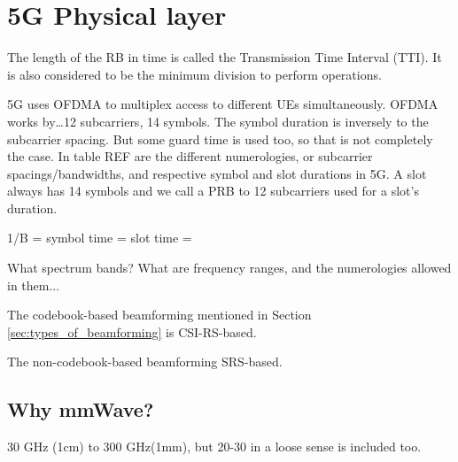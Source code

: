 \section{5G Physical layer}
\label{sec:5gphy}






The length of the RB in time is called the Transmission Time Interval
(TTI). It is also considered to be the minimum division to perform operations. 

5G uses \ac{OFDMA} to multiplex access to different UEs simultaneously. OFDMA works by\dots 12 subcarriers, 14 symbols. The symbol duration is inversely  to the subcarrier spacing. But some guard time is used too, so that is not completely the case. In table REF are the different numerologies, or subcarrier spacings/bandwidths, and respective symbol and slot durations in 5G. A slot always has 14 symbols and we call a \ac{PRB} to 12 subcarriers used for a slot's duration.

1/B = 
symbol time = 
slot time = 


What spectrum bands? What are frequency ranges, and the numerologies allowed in them...



The codebook-based beamforming mentioned in Section \ref{sec:types_of_beamforming} is CSI-RS-based.

The non-codebook-based beamforming SRS-based.




\subsection{Why mmWave?}

30 GHz (1cm) to 300 GHz(1mm), but 20-30 in a loose sense is included too.

